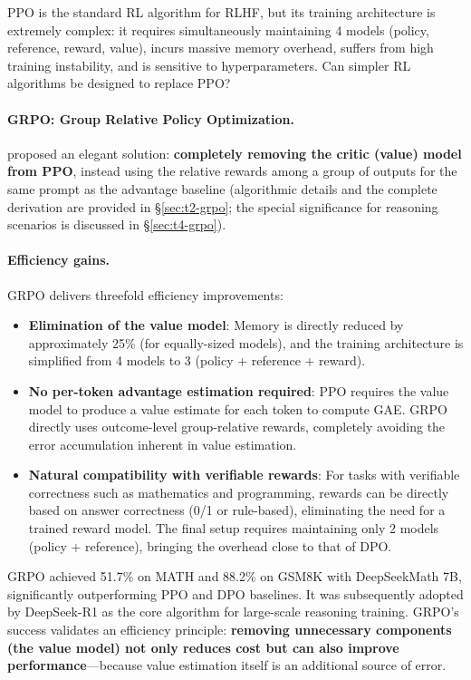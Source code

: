 \begin{problembox}
PPO is the standard RL algorithm for RLHF, but its training architecture is extremely complex:
it requires simultaneously maintaining 4 models (policy, reference, reward, value),
incurs massive memory overhead, suffers from high training instability, and is sensitive to hyperparameters.
Can simpler RL algorithms be designed to replace PPO?
\end{problembox}

\paragraph{GRPO: Group Relative Policy Optimization.}
 proposed an elegant solution:
\textbf{completely removing the critic (value) model from PPO},
instead using the relative rewards among a group of outputs for the same prompt as the advantage baseline
(algorithmic details and the complete derivation are provided in \S\ref{sec:t2-grpo};
the special significance for reasoning scenarios is discussed in \S\ref{sec:t4-grpo}).

\paragraph{Efficiency gains.}
GRPO delivers threefold efficiency improvements:
\begin{itemize}[leftmargin=2em]
  \item \textbf{Elimination of the value model}:
    Memory is directly reduced by approximately 25\% (for equally-sized models),
    and the training architecture is simplified from 4 models to 3 (policy + reference + reward).
  \item \textbf{No per-token advantage estimation required}:
    PPO requires the value model to produce a value estimate for each token to compute GAE.
    GRPO directly uses outcome-level group-relative rewards,
    completely avoiding the error accumulation inherent in value estimation.
  \item \textbf{Natural compatibility with verifiable rewards}:
    For tasks with verifiable correctness such as mathematics and programming,
    rewards can be directly based on answer correctness (0/1 or rule-based),
    eliminating the need for a trained reward model.
    The final setup requires maintaining only 2 models (policy + reference),
    bringing the overhead close to that of DPO.
\end{itemize}

\noindent
GRPO achieved 51.7\% on MATH and 88.2\% on GSM8K with DeepSeekMath 7B,
significantly outperforming PPO and DPO baselines.
It was subsequently adopted by DeepSeek-R1 \cite{deepseek2025r1} as the core algorithm for large-scale reasoning training.
GRPO's success validates an efficiency principle:
\textbf{removing unnecessary components (the value model) not only reduces cost but can also improve performance}---because value estimation itself is an additional source of error.

